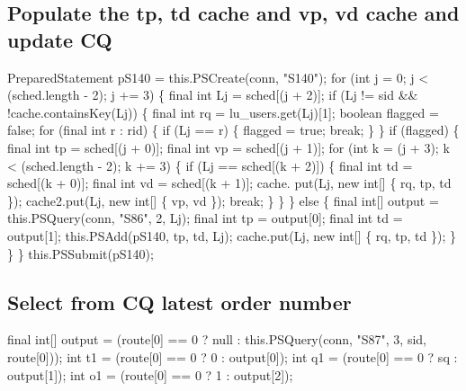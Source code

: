 \subsection{Populate the tp, td cache and vp, vd cache and update CQ}
\nwenddocs{}\endmoddef{}
PreparedStatement pS140 = this.PSCreate(conn, "S140");
for (int j = 0; j < (sched.length - 2); j += 3) \{
  final int Lj = sched[(j + 2)];
  if (Lj != sid && !cache.containsKey(Lj)) \{
    final int rq = lu_users.get(Lj)[1];
    boolean flagged = false;
    for (final int r : rid) \{
      if (Lj == r) \{
        flagged = true;
        break;
      \}
    \}
    if (flagged) \{
      final int tp = sched[(j + 0)];
      final int vp = sched[(j + 1)];
      for (int k = (j + 3); k < (sched.length - 2); k += 3) \{
        if (Lj == sched[(k + 2)]) \{
          final int td = sched[(k + 0)];
          final int vd = sched[(k + 1)];
          cache. put(Lj, new int[] \{ rq, tp, td \});
          cache2.put(Lj, new int[] \{ vp, vd \});
          break;
        \}
      \}
    \} else \{
      final int[] output = this.PSQuery(conn, "S86", 2, Lj);
      final int tp = output[0];
      final int td = output[1];
      this.PSAdd(pS140, tp, td, Lj);
      cache.put(Lj, new int[] \{ rq, tp, td \});
    \}
  \}
\}
this.PSSubmit(pS140);
\nwendcode{}\nwdocspar

\subsection{Select from CQ latest order number}
\nwenddocs{}\endmoddef{}
final int[] output = (route[0] == 0 ? null : this.PSQuery(conn, "S87", 3, sid, route[0]));
int t1 = (route[0] == 0 ?  0 : output[0]);
int q1 = (route[0] == 0 ? sq : output[1]);
int o1 = (route[0] == 0 ?  1 : output[2]);
\nwendcode{}\nwdocspar

